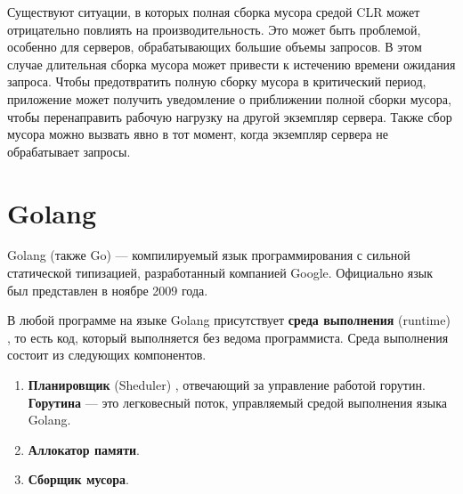 Существуют ситуации, в которых полная сборка мусора средой CLR может отрицательно повлиять на производительность. Это может быть проблемой, особенно для серверов, обрабатывающих большие объемы запросов. В этом случае длительная сборка мусора может привести к истечению времени ожидания запроса. Чтобы предотвратить полную сборку мусора в критический период, приложение может получить уведомление о приближении полной сборки мусора, чтобы перенаправить рабочую нагрузку на другой экземпляр сервера. Также сбор мусора можно вызвать явно в тот момент, когда экземпляр сервера не обрабатывает запросы. \cite{dotnet_gc_notifications}



%
%
%
%
%
%
%
%
%
%
%
%





\section{Golang}

Golang (также Go) \cite{golang} --- компилируемый язык программирования с сильной статической типизацией, разработанный компанией Google. Официально язык был представлен в ноябре 2009 года.

В любой программе на языке Golang присутствует \textbf{среда выполнения} (runtime) \cite{golang_runtime}, то есть код, который выполняется без ведома программиста. Среда выполнения состоит из следующих компонентов.

\begin{enumerate}[label*=\arabic*.]
	\item \textbf{Планировщик} (Sheduler) \cite{golang_scheduler}, отвечающий за управление работой горутин. \textbf{Горутина} --- это легковесный поток, управляемый средой выполнения языка Golang. \cite{golang_goroutine}
	\item \textbf{Аллокатор памяти}.
	\item \textbf{Сборщик мусора}.
\end{enumerate}

